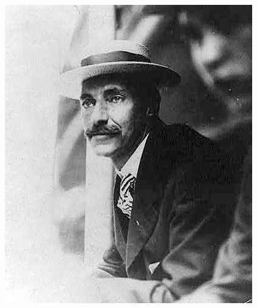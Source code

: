 \documentclass[aspectratio=169]{beamer}
\begin{document}
\begin{frame}
\begin{columns}
\begin{column}{0.5\textwidth}
\end{column}

\begin{column}{0.5\textwidth}  %

\begin{center}
\includegraphics[scale=0.4]{John_Jacob_Astor_1909.jpg}
\end{center}

\end{column}

\end{columns}

\end{frame}
\end{document}

